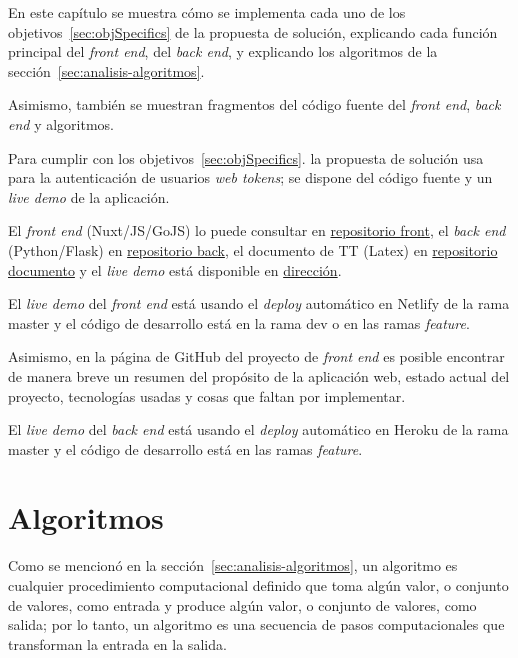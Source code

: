 En este capítulo se muestra cómo se implementa cada uno de los objetivos~\ref{sec:objSpecifics} de la propuesta de solución, explicando cada función principal del \textit{front end}, del \textit{back end}, y explicando los algoritmos de la sección~\ref{sec:analisis-algoritmos}.

Asimismo, también se muestran fragmentos del código fuente del \textit{front end}, \textit{back end} y algoritmos. 


Para cumplir con los objetivos~\ref{sec:objSpecifics}. la propuesta de solución usa para la autenticación de usuarios \textit{web tokens}; se dispone del código fuente y un \textit{live demo} de la aplicación.

\label{ref:prototipo}
El \textit{front end} (Nuxt/JS/GoJS) lo puede consultar en \href{https://github.com/martinez-acosta/TT-2019-B052}{repositorio front}, el \textit{back end} (Python/Flask) en \href{https://github.com/omaraparicio07/api-tt-2019-b052}{repositorio back}, el documento de TT (Latex) en \href{https://github.com/martinez-acosta/DOCS-TT-2019-B052}{repositorio documento} y el \textit{live demo} está disponible en \href{https://serene-haibt-2239b4.netlify.app/}{dirección}.


El \textit{live demo} del \textit{front end} está usando el \textit{deploy} automático en Netlify de la rama master y el código de desarrollo está en la rama dev o en las ramas \textit{feature}.


Asimismo, en la página de GitHub del proyecto de \textit{front end} es posible encontrar de manera breve un resumen del propósito de la aplicación web, estado actual del proyecto, tecnologías usadas y cosas que faltan por implementar.


El \textit{live demo} del \textit{back end} está usando el \textit{deploy} automático en Heroku de la rama master y el código de desarrollo está en las ramas \textit{feature}.





%









\section{Algoritmos}
Como se mencionó en la sección~\ref{sec:analisis-algoritmos}, un algoritmo es cualquier procedimiento computacional definido que toma algún valor, o conjunto de valores, como entrada y produce algún valor, o conjunto de valores, como salida; por lo tanto, un algoritmo es una secuencia de pasos computacionales que transforman la entrada en la salida.


